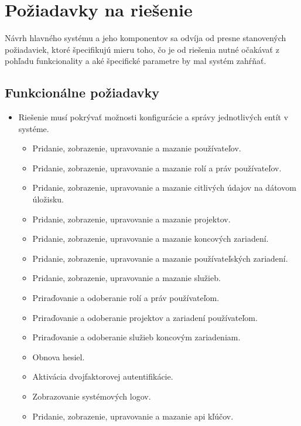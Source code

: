 \chapter{Požiadavky na riešenie}\label{ch:poziadavky}

Návrh hlavného systému a jeho komponentov sa odvíja od presne stanovených požiadaviek, ktoré špecifikujú mieru toho, čo
je od riešenia nutné očakávať z pohľadu funkcionality a aké špecifické parametre by mal systém zahŕňať.

\section{Funkcionálne požiadavky}\label{sec:funkcionalne-poziadavky}

\begin{itemize}
    \item Riešenie musí pokrývať možnosti konfigurácie a správy jednotlivých entít v systéme.
    \begin{itemize}
        \item Pridanie, zobrazenie, upravovanie a mazanie používateľov.
        \item Pridanie, zobrazenie, upravovanie a mazanie rolí a práv používateľov.
        \item Pridanie, zobrazenie, upravovanie a mazanie citlivých údajov na dátovom úložisku.
        \item Pridanie, zobrazenie, upravovanie a mazanie projektov.
        \item Pridanie, zobrazenie, upravovanie a mazanie koncových zariadení.
        \item Pridanie, zobrazenie, upravovanie a mazanie používateľských zariadení.
        \item Pridanie, zobrazenie, upravovanie a mazanie služieb.
        \item Priraďovanie a odoberanie rolí a práv používateľom.
        \item Priraďovanie a odoberanie projektov a zariadení používateľom.
        \item Priraďovanie a odoberanie služieb koncovým zariadeniam.
        \item Obnova hesiel.
        \item Aktivácia dvojfaktorovej autentifikácie.
        \item Zobrazovanie systémových logov.
        \item Pridanie, zobrazenie, upravovanie a mazanie api kľúčov.
    \end{itemize}

\end{itemize}
